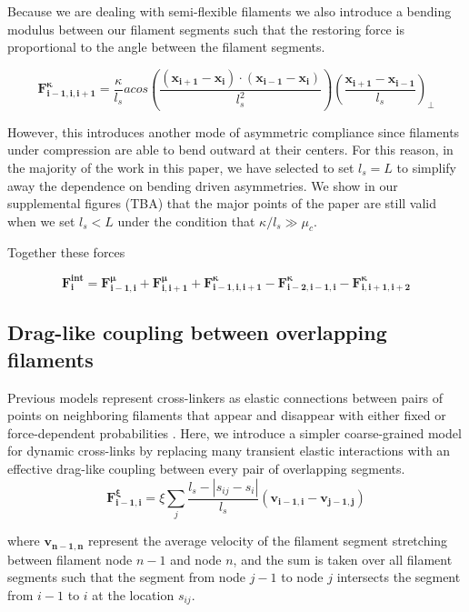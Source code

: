 \documentclass[10pt,letterpaper]{article}
\begin{document}
Because we are dealing with semi-flexible filaments we also introduce a bending modulus between our filament segments such that the restoring force is proportional to the angle between the filament segments.   

\begin{equation}
\label{eqn:bend_spring}
\mathbf{F^{\kappa}_{i-1,i,i+1}} = \frac{\kappa}{l_s} acos \left(\frac{(\mathbf{x_{i+1}}-\mathbf{x_i})\cdot (\mathbf{x_{i-1}}-\mathbf{x_i})}{l_s^2}\right)\left(\frac{\mathbf{x_{i+1}}-\mathbf{x_{i-1}}}{l_s}\right)_\perp
\end{equation}

However, this introduces another mode of asymmetric compliance since filaments under compression are able to bend outward at their centers.  For this reason, in the majority of the work in this paper, we have selected to set $l_s=L$ to simplify away the dependence on bending driven asymmetries.  We show in our supplemental figures (TBA) that the major points of the paper are still valid when we set $l_s<L$ under the condition that $\kappa/l_s\gg\mu_c$.

Together these forces 

\begin{equation}
\label{eqn:internal}
\mathbf{F^{int}_i} = \mathbf{F^{\mu}_{i-1,i}} + \mathbf{F^{\mu}_{i,i+1}} + \mathbf{F^{\kappa}_{i-1,i,i+1}} - \mathbf{F^{\kappa}_{i-2,i-1,i}} - \mathbf{F^{\kappa}_{i,i+1,i+2}}
\end{equation}

\subsection*{Drag-like coupling between overlapping filaments}
\label{exp_drag}
Previous models represent cross-linkers as elastic connections between pairs of points on neighboring filaments that appear and disappear with either fixed or force-dependent probabilities \cite{model_taeyoon,theo_crosslinknonlinear}.  Here, we introduce a simpler coarse-grained model for dynamic cross-links by replacing many transient elastic interactions with an effective drag-like coupling between every pair of overlapping segments.
\begin{equation}
\label{eqn:drag}
\mathbf{F^{\xi}_{i-1,i}} = \xi \sum_j \frac{l_s-|s_{ij}-s_i|}{l_s}  (\mathbf{v_{i-1,i}}-\mathbf{v_{j-1,j}}) 
\end{equation}

where $\mathbf{v_{n-1,n}}$ represent the average velocity of the filament segment stretching between filament node $n-1$ and node $n$, and the sum is taken over all filament segments such that the segment from node $j-1$ to node $j$ intersects the segment from $i-1$ to $i$ at the location $s_{ij}$.  
\end{document}
